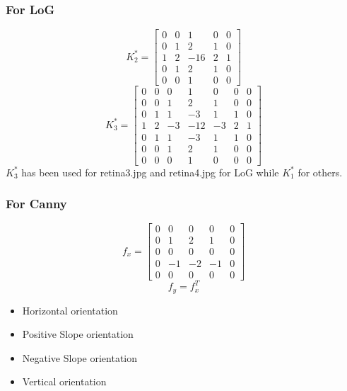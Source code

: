 \documentclass[11pt]{beamer}
\begin{document}
\begin{frame}
\frametitle{For LoG}
\[
K_2^* =
\begin{bmatrix}
 0 & 0 &   1 & 0 & 0\\
 0 & 1 &   2 & 1 & 0\\
 1 & 2 & -16 & 2 & 1\\
 0 & 1 &   2 & 1 & 0\\
 0 & 0 &   1 & 0 & 0
\end{bmatrix} 
\]\vfill
\[
K_3^* =
\begin{bmatrix}
 0 & 0 &  0 &   1 & 0 & 0 & 0\\
 0 & 0 &  1 &   2 & 1 & 0 & 0\\
 0 & 1 &  1 &  -3 & 1 & 1 & 0\\
 1 & 2 & -3 & -12 &-3 & 2 & 1\\
 0 & 1 &  1 &  -3 & 1 & 1 & 0\\
 0 & 0 &  1 &   2 & 1 & 0 & 0\\
 0 & 0 &  0 &   1 & 0 & 0 & 0
\end{bmatrix} 
\]\vfill
$K_3^*$ has been used for retina3.jpg and retina4.jpg  for LoG while $K_1^*$ for others.
\end{frame}

\begin{frame}
\frametitle{For Canny}
\[
f_x =
\begin{bmatrix}
 0 & 0 & 0 & 0 & 0\\
 0 & 1 & 2 & 1 & 0\\
 0 & 0 & 0 & 0 & 0\\
 0 &-1 &-2 &-1 & 0\\
 0 & 0 & 0 & 0 & 0
\end{bmatrix} 
\]\vfill
\[f_y = f_x^T\]
\begin{itemize}
\item[\color{green}\MVRightarrow] \begin{center} Horizontal orientation \end{center}
\item[\color{blue}\rotatebox{45}{\MVRightarrow}] \begin{center} Positive Slope orientation\end{center}
\item[\color{cyan}\rotatebox{135}{\MVRightarrow}] \begin{center}Negative Slope orientation\end{center}
\item[\color{red}\rotatebox{90}{\MVRightarrow}] \begin{center}Vertical orientation\end{center}
\end{itemize}
\end{frame}
\end{document}
